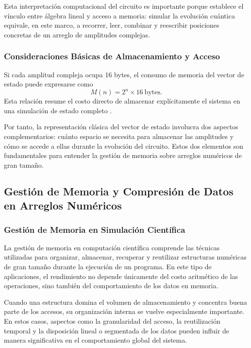 Esta interpretación computacional del circuito es importante porque establece el vínculo entre álgebra lineal y acceso a memoria: simular la evolución cuántica equivale, en este marco, a recorrer, leer, combinar y reescribir posiciones concretas de un arreglo de amplitudes complejas.

\subsubsection{Consideraciones Básicas de Almacenamiento y Acceso}

Si cada amplitud compleja ocupa 16 bytes, el consumo de memoria del vector de estado puede expresarse como
\[
    M(n)=2^n \times 16\ \text{bytes}.
\]
Esta relación resume el costo directo de almacenar explícitamente el sistema en una simulación de estado completo \parencite{Jones2019,wu2019full}. 

Por tanto, la representación clásica del vector de estado involucra dos aspectos complementarios: cuánto espacio se necesita para almacenar las amplitudes y cómo se accede a ellas durante la evolución del circuito. Estos dos elementos son fundamentales para entender la gestión de memoria sobre arreglos numéricos de gran tamaño.

\subsection{Gestión de Memoria y Compresión de Datos en Arreglos Numéricos}

\subsubsection{Gestión de Memoria en Simulación Científica}

La gestión de memoria en computación científica comprende las técnicas utilizadas para organizar, almacenar, recuperar y reutilizar estructuras numéricas de gran tamaño durante la ejecución de un programa. En este tipo de aplicaciones, el rendimiento no depende únicamente del costo aritmético de las operaciones, sino también del comportamiento de los datos en memoria.

Cuando una estructura domina el volumen de almacenamiento y concentra buena parte de los accesos, su organización interna se vuelve especialmente importante. En estos casos, aspectos como la granularidad del acceso, la reutilización temporal y la disposición lineal o segmentada de los datos pueden influir de manera significativa en el comportamiento global del sistema.

